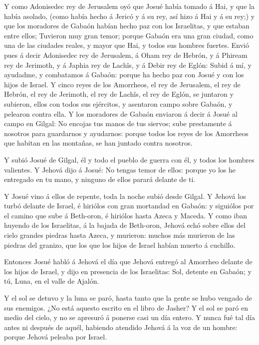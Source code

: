  Y como Adonisedec rey de Jerusalem oyó que Josué había
tomado á Hai, y que la había asolado, (como había hecho á Jericó y á su
rey, así hizo á Hai y á su rey;) y que los moradores de Gabaón habían
hecho paz con los Israelitas, y que estaban entre ellos; 
Tuvieron muy gran temor; porque Gabaón era una gran ciudad, como una de
las ciudades reales, y mayor que Hai, y todos sus hombres fuertes.
 Envió pues á decir Adonisedec rey de Jerusalem, á Oham rey
de Hebrón, y á Phiream rey de Jerimoth, y á Japhia rey de Lachîs, y á
Debir rey de Eglón:  Subid á mí, y ayudadme, y combatamos á
Gabaón: porque ha hecho paz con Josué y con los hijos de Israel.
 Y cinco reyes de los Amorrheos, el rey de Jerusalem, el rey
de Hebrón, el rey de Jerimoth, el rey de Lachîs, el rey de Eglón, se
juntaron y subieron, ellos con todos sus ejércitos, y asentaron campo
sobre Gabaón, y pelearon contra ella.  Y los moradores de
Gabaón enviaron á decir á Josué al campo en Gilgal: No encojas tus manos
de tus siervos; sube prestamente á nosotros para guardarnos y ayudarnos:
porque todos los reyes de los Amorrheos que habitan en las montañas, se
han juntado contra nosotros.

 Y subió Josué de Gilgal, él y todo el pueblo de guerra con
él, y todos los hombres valientes.  Y Jehová dijo á Josué:
No tengas temor de ellos: porque yo los he entregado en tu mano, y
ninguno de ellos parará delante de ti.

 Y Josué vino á ellos de repente, toda la noche subió desde
Gilgal.  Y Jehová los turbó delante de Israel, é hiriólos
con gran mortandad en Gabaón: y siguiólos por el camino que sube á
Beth-oron, é hiriólos hasta Azeca y Maceda.  Y como iban
huyendo de los Israelitas, á la bajada de Beth-oron, Jehová echó sobre
ellos del cielo grandes piedras hasta Azeca, y murieron: muchos más
murieron de las piedras del granizo, que los que los hijos de Israel
habían muerto á cuchillo.

 Entonces Josué habló á Jehová el día que Jehová entregó al
Amorrheo delante de los hijos de Israel, y dijo en presencia de los
Israelitas: Sol, detente en Gabaón; y tú, Luna, en el valle de Ajalón.

 Y el sol se detuvo y la luna se paró, hasta tanto que la
gente se hubo vengado de sus enemigos. ¿No está aquesto escrito en el
libro de Jasher? Y el sol se paró en medio del cielo, y no se apresuró á
ponerse casi un día entero.  Y nunca fué tal día antes ni
después de aquél, habiendo atendido Jehová á la voz de un hombre: porque
Jehová peleaba por Israel.

